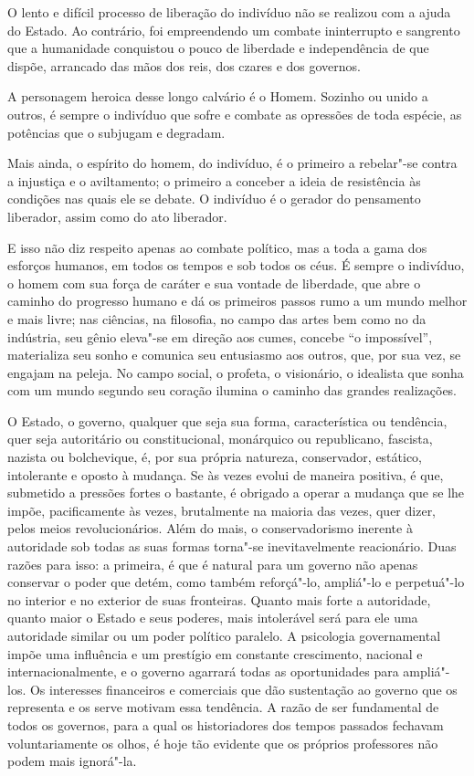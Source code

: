 O lento e difícil processo de liberação do indivíduo não se realizou com
a ajuda do Estado. Ao contrário, foi empreendendo um combate
ininterrupto e sangrento que a humanidade conquistou o pouco de
liberdade e independência de que dispõe, arrancado das mãos dos reis,
dos czares e dos governos.

A personagem heroica desse longo calvário é o Homem. Sozinho ou unido 
a outros, é sempre o indivíduo que sofre e combate as opressões de toda
espécie, as potências que o subjugam e degradam.

Mais ainda, o espírito do homem, do indivíduo, é o primeiro a
rebelar"-se contra a injustiça e o aviltamento; o primeiro a conceber
a ideia de resistência às condições nas quais ele se debate. O
indivíduo é o gerador do pensamento liberador, assim como do ato
liberador.

E isso não diz respeito apenas ao combate político, mas a toda a gama
dos esforços humanos, em todos os tempos e sob todos os céus. É sempre
o indivíduo, o homem com sua força de caráter e sua vontade de
liberdade, que abre o caminho do progresso humano e dá os primeiros
passos rumo a um mundo melhor e mais livre; nas ciências, na filosofia,
no campo das artes bem como no da indústria, seu gênio eleva"-se em
direção aos cumes, concebe “o impossível”, materializa seu sonho e
comunica seu entusiasmo aos outros, que, por sua vez, se engajam na
peleja. No campo social, o profeta, o visionário, o idealista que sonha
com um mundo segundo seu coração ilumina o caminho das grandes
realizações.

O Estado, o governo, qualquer que seja sua forma, característica ou
tendência, quer seja autoritário ou constitucional, monárquico ou
republicano, fascista, nazista ou bolchevique, é, por sua própria
natureza, conservador, estático, intolerante e oposto à mudança. Se às
vezes evolui de maneira positiva, é que, submetido a pressões fortes o
bastante, é obrigado a operar a mudança que se lhe impõe,
pacificamente às vezes, brutalmente na maioria das vezes, quer dizer,
pelos meios revolucionários. Além do mais, o conservadorismo inerente à
autoridade sob todas as suas formas torna"-se inevitavelmente
reacionário. Duas razões para isso: a primeira, é que é natural para um
governo não apenas conservar o poder que detém, como também
reforçá"-lo, ampliá"-lo e perpetuá"-lo no interior e no exterior de
suas fronteiras. Quanto mais forte a autoridade, quanto maior o
Estado e seus poderes, mais intolerável será para ele uma autoridade
similar ou um poder político paralelo. A psicologia governamental impõe
uma influência e um prestígio em constante crescimento, nacional e
internacionalmente, e o governo agarrará todas as oportunidades para
ampliá"-los. Os interesses financeiros e comerciais que dão
sustentação ao governo que os representa e os serve motivam essa
tendência. A razão de ser fundamental de todos os governos, para a qual
os historiadores dos tempos passados fechavam voluntariamente os olhos, é
hoje tão evidente que os próprios professores não podem mais
ignorá"-la.

